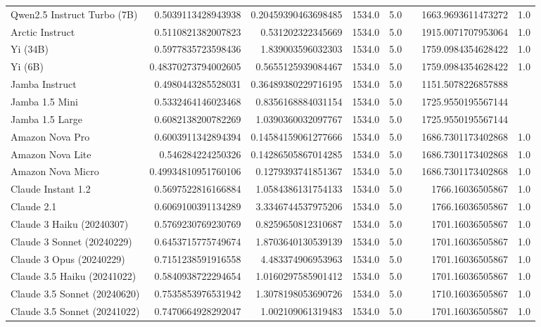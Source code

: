 \begin{table}[htp]
{\begin{tabular}{lrrrrrrr}
Qwen2.5 Instruct Turbo (7B) & 0.5039113428943938 & 0.20459390463698485 & 1534.0 & 5.0 &  & 1663.9693611473272 & 1.0 \\
Arctic Instruct & 0.5110821382007823 & 0.531202322345669 & 1534.0 & 5.0 &  & 1915.0071707953064 & 1.0 \\
Yi (34B) & 0.5977835723598436 & 1.839003596032303 & 1534.0 & 5.0 &  & 1759.0984354628422 & 1.0 \\
Yi (6B) & 0.48370273794002605 & 0.5655125939084467 & 1534.0 & 5.0 &  & 1759.0984354628422 & 1.0 \\
Jamba Instruct & 0.4980443285528031 & 0.36489380229716195 & 1534.0 & 5.0 &  & 1151.5078226857888 &  \\
Jamba 1.5 Mini & 0.5332464146023468 & 0.8356168884031154 & 1534.0 & 5.0 &  & 1725.9550195567144 &  \\
Jamba 1.5 Large & 0.6082138200782269 & 1.0390360032097767 & 1534.0 & 5.0 &  & 1725.9550195567144 &  \\
Amazon Nova Pro & 0.6003911342894394 & 0.14584159061277666 & 1534.0 & 5.0 &  & 1686.7301173402868 & 1.0 \\
Amazon Nova Lite & 0.546284224250326 & 0.14286505867014285 & 1534.0 & 5.0 &  & 1686.7301173402868 & 1.0 \\
Amazon Nova Micro & 0.49934810951760106 & 0.1279393741851367 & 1534.0 & 5.0 &  & 1686.7301173402868 & 1.0 \\
Claude Instant 1.2 & 0.5697522816166884 & 1.0584386131754133 & 1534.0 & 5.0 &  & 1766.16036505867 & 1.0 \\
Claude 2.1 & 0.6069100391134289 & 3.3346744537975206 & 1534.0 & 5.0 &  & 1766.16036505867 & 1.0 \\
Claude 3 Haiku (20240307) & 0.5769230769230769 & 0.8259650812310687 & 1534.0 & 5.0 &  & 1701.16036505867 & 1.0 \\
Claude 3 Sonnet (20240229) & 0.6453715775749674 & 1.8703640130539139 & 1534.0 & 5.0 &  & 1701.16036505867 & 1.0 \\
Claude 3 Opus (20240229) & 0.7151238591916558 & 4.483374906953963 & 1534.0 & 5.0 &  & 1701.16036505867 & 1.0 \\
Claude 3.5 Haiku (20241022) & 0.5840938722294654 & 1.0160297585901412 & 1534.0 & 5.0 &  & 1701.16036505867 & 1.0 \\
Claude 3.5 Sonnet (20240620) & 0.7535853976531942 & 1.3078198053690726 & 1534.0 & 5.0 &  & 1710.16036505867 & 1.0 \\
Claude 3.5 Sonnet (20241022) & 0.7470664928292047 & 1.002109061319483 & 1534.0 & 5.0 &  & 1701.16036505867 & 1.0 \\

\end{tabular}}
\end{table}
